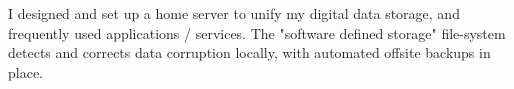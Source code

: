 \descript{ }
\vspace*{-\topsep}  %
\begin{justify}
I designed and set up a home server to unify my digital data storage, and frequently used applications / services.
The "software defined storage" file-system detects and corrects data corruption locally, with automated offsite backups in place.
\end{justify}